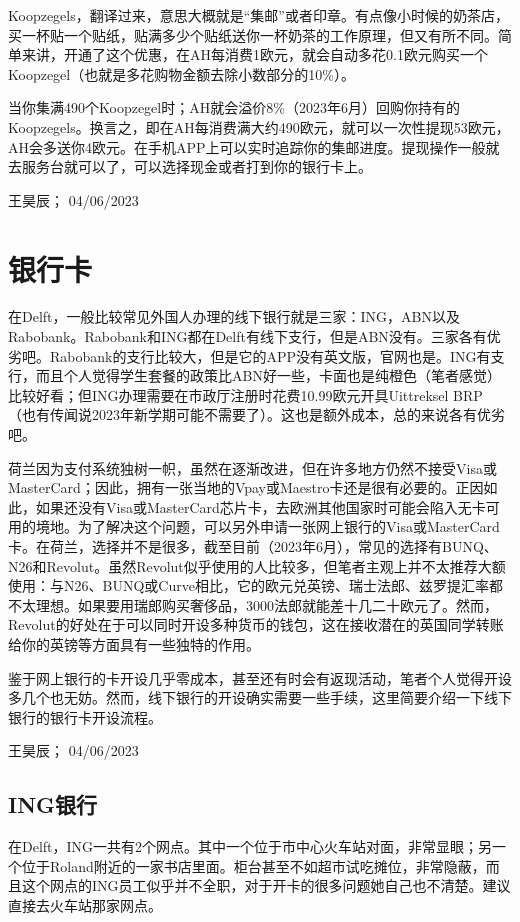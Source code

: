 Koopzegels，翻译过来，意思大概就是“集邮”或者印章。有点像小时候的奶茶店，买一杯贴一个贴纸，贴满多少个贴纸送你一杯奶茶的工作原理，但又有所不同。简单来讲，开通了这个优惠，在AH每消费1欧元，就会自动多花0.1欧元购买一个Koopzegel（也就是多花购物金额去除小数部分的10\%）。

当你集满490个Koopzegel时；AH就会溢价8\%（2023年6月）回购你持有的Koopzegels。换言之，即在AH每消费满大约490欧元，就可以一次性提现53欧元，AH会多送你4欧元。在手机APP上可以实时追踪你的集邮进度。提现操作一般就去服务台就可以了，可以选择现金或者打到你的银行卡上。
\begin{flushright}
王昊辰； 04/06/2023
\end{flushright}
\vspace{\betsubsec} %

\section{银行卡}
在Delft，一般比较常见外国人办理的线下银行就是三家：ING，ABN以及Rabobank。Rabobank和ING都在Delft有线下支行，但是ABN没有。三家各有优劣吧。Rabobank的支行比较大，但是它的APP没有英文版，官网也是。ING有支行，而且个人觉得学生套餐的政策比ABN好一些，卡面也是纯橙色（笔者感觉）比较好看；但ING办理需要在市政厅注册时花费10.99欧元开具Uittreksel BRP （也有传闻说2023年新学期可能不需要了）。这也是额外成本，总的来说各有优劣吧。

荷兰因为支付系统独树一帜，虽然在逐渐改进，但在许多地方仍然不接受Visa或MasterCard；因此，拥有一张当地的Vpay或Maestro卡还是很有必要的。正因如此，如果还没有Visa或MasterCard芯片卡，去欧洲其他国家时可能会陷入无卡可用的境地。为了解决这个问题，可以另外申请一张网上银行的Visa或MasterCard卡。在荷兰，选择并不是很多，截至目前（2023年6月），常见的选择有BUNQ、N26和Revolut。虽然Revolut似乎使用的人比较多，但笔者主观上并不太推荐大额使用：与N26、BUNQ或Curve相比，它的欧元兑英镑、瑞士法郎、兹罗提汇率都不太理想。如果要用瑞郎购买奢侈品，3000法郎就能差十几二十欧元了。然而，Revolut的好处在于可以同时开设多种货币的钱包，这在接收潜在的英国同学转账给你的英镑等方面具有一些独特的作用。

鉴于网上银行的卡开设几乎零成本，甚至还有时会有返现活动，笔者个人觉得开设多几个也无妨。然而，线下银行的开设确实需要一些手续，这里简要介绍一下线下银行的银行卡开设流程。
\begin{flushright}
王昊辰； 04/06/2023
\end{flushright}

\subsection{ING银行}
在Delft，ING一共有2个网点。其中一个位于市中心火车站对面，非常显眼；另一个位于Roland附近的一家书店里面。柜台甚至不如超市试吃摊位，非常隐蔽，而且这个网点的ING员工似乎并不全职，对于开卡的很多问题她自己也不清楚。建议直接去火车站那家网点。

